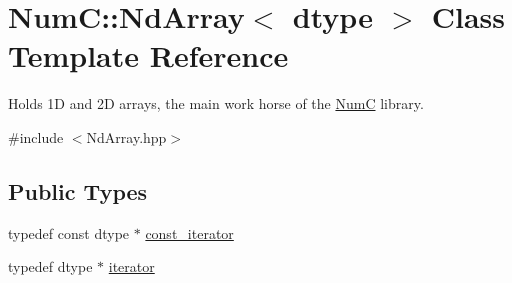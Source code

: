 \hypertarget{class_num_c_1_1_nd_array}{}\section{NumC\+:\+:Nd\+Array$<$ dtype $>$ Class Template Reference}
\label{class_num_c_1_1_nd_array}


Holds 1D and 2D arrays, the main work horse of the \mbox{\hyperlink{namespace_num_c}{NumC}} library.  




{\ttfamily \#include $<$Nd\+Array.\+hpp$>$}

\subsection*{Public Types}
\begin{DoxyCompactItemize}
\item 
typedef const dtype $\ast$ \mbox{\hyperlink{class_num_c_1_1_nd_array_a445cec326684b0066bddae07ba06eddf}{const\+\_\+iterator}}
\item 
typedef dtype $\ast$ \mbox{\hyperlink{class_num_c_1_1_nd_array_a49cd61f019d7106a40ffdb9c3ee98f08}{iterator}}
\end{DoxyCompactItemize}
